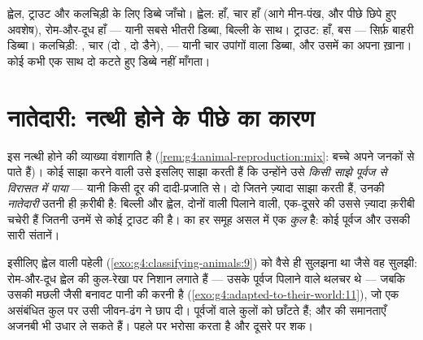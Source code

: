 \begin{example}[तीन जंतुओं को रखना]\label{ex:g6:classification-kinship:placing}
ह्वेल, ट्राउट और कलचिड़ी के लिए डिब्बे जाँचो। ह्वेल:  हाँ, चार 
हाँ (आगे मीन-पंख, और पीछे छिपे हुए अवशेष), रोम-और-दूध हाँ --- यानी
सबसे भीतरी डिब्बा, बिल्ली के साथ। ट्राउट:  हाँ, बस --- सिर्फ़ बाहरी
डिब्बा। कलचिड़ी: , चार  (दो , दो डैने),  --- यानी चार
उपांगों वाला डिब्बा, और उसमें  का अपना ख़ाना। कोई  कभी एक साथ
दो कटते हुए डिब्बे नहीं माँगता।
\end{example}

\section{नातेदारी: नत्थी होने के पीछे का कारण}

\begin{proposition}[साझे अभिलक्षण साझे पूर्वजों का मतलब हैं]\label{prop:g6:classification-kinship:kinship}
इस नत्थी होने की व्याख्या वंशागति है
(\cref{rem:g4:animal-reproduction:mix}: बच्चे अपने जनकों से पाते हैं)।
कोई  साझा करने वाली  उसे इसलिए साझा करती हैं कि
उन्होंने उसे \emph{किसी साझे पूर्वज से विरासत में पाया} --- यानी किसी
दूर की दादी-प्रजाति से। दो  जितने ज़्यादा  साझा करती
हैं, उनकी \emph{नातेदारी} उतनी ही क़रीबी है: बिल्ली और
ह्वेल, दोनों  वाली  पिलाने वाली, एक-दूसरे की उससे ज़्यादा क़रीबी
चचेरी हैं जितनी उनमें से कोई ट्राउट की है।  का हर समूह असल में
एक \emph{कुल} है: कोई पूर्वज और उसकी सारी संतानें।
\end{proposition}
\admitted

\begin{example}[ह्वेल, आख़िरकार ठीक से पढ़ी हुई]\label{ex:g6:classification-kinship:whale}
इसीलिए ह्वेल वाली पहेली
(\cref{exo:g4:classifying-animals:9}) को वैसे ही सुलझना था जैसे वह
सुलझी: रोम-और-दूध ह्वेल की कुल-रेखा पर निशान लगाते हैं --- उसके पूर्वज
 पिलाने वाले थलचर  थे --- जबकि उसकी मछली जैसी बनावट पानी की
करनी है (\cref{exo:g4:adapted-to-their-world:11}), जो एक असंबंधित कुल
पर उसी जीवन-ढंग ने छाप दी। पूर्वजों वाले  कुलों को छाँटते हैं;
और  की समानताएँ अजनबी भी उधार ले सकते हैं।  पहले पर भरोसा
करता है और दूसरे पर शक।
\end{example}

